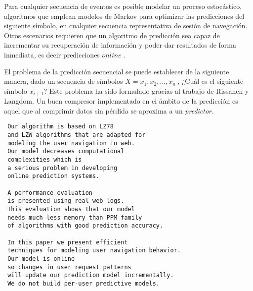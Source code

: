 Para cualquier secuencia de eventos es posible modelar un proceso estocástico, algoritmos que emplean modelos de Markov para optimizar las predicciones del siguiente símbolo, en cualquier secuencia representativa  de sesión de navegación. Otros escenarios requieren que un algoritmo de predicción sea capaz de incrementar su recuperación de información  y poder dar resultados de forma inmediata, es decir predicciones $online$ .

El problema de la predicción secuencial se puede establecer de la siguiente manera, dado un secuencia de símbolos $ X = x_{1}, x_{2}, \dots, x_{n}\ $, ¿Cuál es el siguiente símbolo $x_{i+1}$? Este problema ha sido formulado gracias al trabajo de  Rissanen\cite{Rissanen1983} y Langdom\cite{Langdon1983}. Un buen compresor implementado en el ámbito de la predicción es aquel que al comprimir datos sin pérdida se aproxima a un \emph{predictor}.





\begin{verbatim}
 Our algorithm is based on LZ78 
 and LZW algorithms that are adapted for 
 modeling the user navigation in web. 
 Our model decreases computational 
 complexities which is 
 a serious problem in developing 
 online prediction systems. 

 A performance evaluation 
 is presented using real web logs. 
 This evaluation shows that our model 
 needs much less memory than PPM family 
 of algorithms with good prediction accuracy.
 
 In this paper we present efficient 
 techniques for modeling user navigation behavior. 
 Our model is online 
 so changes in user request patterns 
 will update our prediction model incrementally. 
 We do not build per-user predictive models. 
\end{verbatim}
\LDCMoghaddam


 





